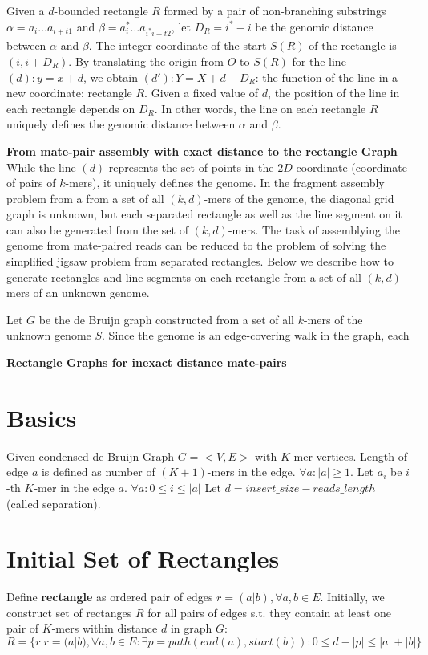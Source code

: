 \documentclass[a4paper]{article}
\begin{document}
Given a $d$-bounded rectangle $R$ formed by a pair of non-branching substrings $\alpha = a_i\ldots a_{i+t1}$
and $\beta = a_i^*\ldots a_{i^*i+ t2}$, let $D_R= i^* - i$ be the genomic distance between $\alpha$ and $\beta$. The integer 
coordinate of the start $S(R)$ of the rectangle is $(i, i + D_R)$. By translating the origin from  $O$ to $S(R)$ for the line
$(d): y = x + d$, we obtain $(d'): Y = X + d - D_R$: the function of the line in a new coordinate: rectangle $R$. Given a fixed
value of $d$, the position of the line in each rectangle depends on $D_R$. In other words, the line on each rectangle $R$ 
uniquely defines the genomic distance between $\alpha$ and $\beta$. 


\noindent
\textbf{From mate-pair assembly with exact distance to the rectangle Graph}
While the line $(d)$ represents the 
set of points in the $2D$ coordinate (coordinate of pairs of $k$-mers), it uniquely defines the genome.
In the fragment assembly problem from a from a set of all $(k,d)$-mers of the genome, 
the diagonal grid graph is unknown, but each separated rectangle as well 
as the line segment on it can also be generated
from the set of $(k,d)$-mers. The task of assemblying the genome from mate-paired reads can be 
reduced to the problem of solving the simplified jigsaw problem from separated rectangles. Below we describe how
to generate rectangles and line segments on each rectangle from a set of all $(k,d)$-mers of an unknown genome.  



Let $G$ be the de Bruijn graph constructed from a set of all $k$-mers of the unknown genome $S$. Since the genome is 
an edge-covering walk in the graph, each  





\noindent
\textbf{Rectangle Graphs for inexact distance mate-pairs}



\section{Basics}

Given condensed de Bruijn Graph $G = <V,E>$ with $K$-mer vertices.
Length of edge $a$ is defined as number of $(K+1)$-mers in the edge. $\forall a: |a| \geq 1$.
Let $a_i$ be $i$-th $K$-mer in the edge $a$. $\forall a: 0 \leq i \leq |a|$
Let $d = insert\_size - reads\_length$ (called separation).
\section{Initial Set of Rectangles}
Define \textbf{rectangle} as ordered pair of edges $r = (a|b), \forall a, b \in E$.
Initially, we construct set of rectanges $R$ for all pairs of edges s.t. they contain at least one pair of $K$-mers within distance $d$ in graph $G$:
$$ R = \{ r | r = (a|b), \forall a, b \in E : \exists p = path(end(a), start(b)) : 0 \leq d - |p| \leq |a| + |b| \} $$
\end{document}
